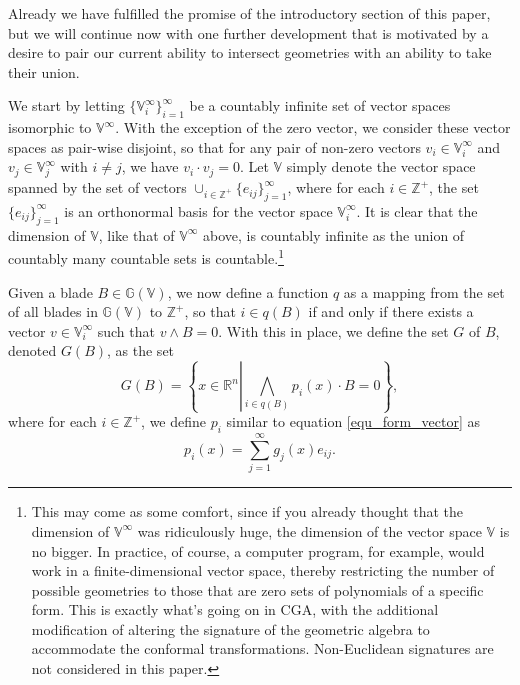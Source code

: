 \documentclass{birkjour}
\theoremstyle{definition}
\theoremstyle{remark}
\numberwithin{equation}{section}
\newcommand{\G}{\mathbb{G}}
\newcommand{\V}{\mathbb{V}}
\newcommand{\R}{\mathbb{R}}
\newcommand{\Z}{\mathbb{Z}}
\begin{document}
Already we have fulfilled the promise of the introductory section of this paper,
but we will continue now with one further development that is motivated by a desire
to pair our current ability to intersect geometries with an ability to take their union.

We start by letting $\{\V_i^\infty\}_{i=1}^\infty$ be a countably infinite set of
vector spaces isomorphic to $\V^\infty$.  With the exception of the zero vector,
we consider these vector spaces as pair-wise disjoint, so that for any pair of non-zero
vectors $v_i\in\V_i^\infty$ and $v_j\in\V_j^\infty$ with $i\neq j$, we have $v_i\cdot v_j=0$.
Let $\V$ simply denote the vector space spanned by the set of vectors $\cup_{i\in\Z^+}\{e_{ij}\}_{j=1}^\infty$,
where for each $i\in\Z^+$, the set $\{e_{ij}\}_{j=1}^\infty$ is an orthonormal basis for
the vector space $\V_i^\infty$.
It is clear that the dimension of $\V$,
like that of $\V^\infty$ above, is countably infinite as the union of countably many countable
sets is countable.\footnote{This may come as some comfort, since if you already thought that
the dimension of $\V^\infty$ was ridiculously huge, the dimension of the vector space $\V$ is no bigger.
In practice, of course, a computer
program, for example, would work in a finite-dimensional vector space, thereby restricting
the number of possible geometries to those that are zero sets of polynomials of a specific form.
This is exactly what's going on in CGA, with the additional modification of altering the signature
of the geometric algebra to accommodate the conformal transformations.  Non-Euclidean signatures
are not considered in this paper.}

Given a blade $B\in\G(\V)$, we now define a function $q$ as a mapping from
the set of all blades in $\G(\V)$ to $\Z^+$, so that $i\in q(B)$ if and only if
there exists a vector $v\in\V_i^\infty$ such that $v\wedge B=0$.  With this in place,
we define the set $G$ of $B$, denoted $G(B)$, as the set
\begin{equation}
G(B) = \left\{x\in\R^n\left|\bigwedge_{i\in q(B)} p_i(x)\cdot B=0\right.\right\},
\end{equation}
where for each $i\in\Z^+$, we define $p_i$ similar to equation \eqref{equ_form_vector} as
\begin{equation}
p_i(x) = \sum_{j=1}^\infty g_j(x)e_{ij}.
\end{equation}
\end{document}
